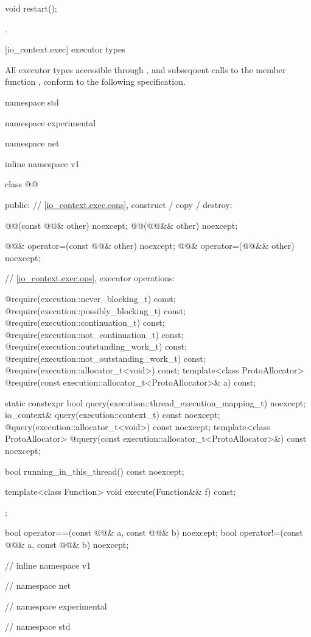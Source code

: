 %
\begin{itemdecl}
void restart();
\end{itemdecl}

\begin{itemdescr}
\pnum
\postconditions {}.
\end{itemdescr}




[io_context.exec]{ executor types}

\pnum
All executor types accessible through , and subsequent calls to the member function , conform to the following specification.

%
\begin{codeblock}
namespace std {
namespace experimental {
namespace net {
inline namespace v1 {

  class @@
  {
  public:
    // \ref{io_context.exec.cons}, construct / copy / destroy:

    @@(const @@& other) noexcept;
    @@(@@&& other) noexcept;

    @@& operator=(const @@& other) noexcept;
    @@& operator=(@@&& other) noexcept;

    // \ref{io_context.exec.ops}, executor operations:

    @\seebelow@ require(execution::never_blocking_t) const;
    @\seebelow@ require(execution::possibly_blocking_t) const;
    @\seebelow@ require(execution::continuation_t) const;
    @\seebelow@ require(execution::not_continuation_t) const;
    @\seebelow@ require(execution::outstanding_work_t) const;
    @\seebelow@ require(execution::not_outstanding_work_t) const;
    @\seebelow@ require(execution::allocator_t<void>) const;
    template<class ProtoAllocator>
      @\seebelow@ require(const execution::allocator_t<ProtoAllocator>& a) const;

    static constexpr bool query(execution::thread_execution_mapping_t) noexcept;
    io_context& query(execution::context_t) const noexcept;
    @\seebelow@ query(execution::allocator_t<void>) const noexcept;
    template<class ProtoAllocator>
      @\seebelow@ query(const execution::allocator_t<ProtoAllocator>&) const noexcept;

    bool running_in_this_thread() const noexcept;

    template<class Function>
      void execute(Function&& f) const;
  };

  bool operator==(const @@& a, const @@& b) noexcept;
  bool operator!=(const @@& a, const @@& b) noexcept;

} // inline namespace v1
} // namespace net
} // namespace experimental
} // namespace std
\end{codeblock}

